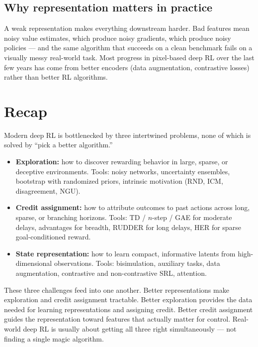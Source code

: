 \documentclass[11pt, oneside]{book}
\begin{document}
\subsection{Why representation matters in practice}

A weak representation makes everything downstream harder.
Bad features mean noisy value estimates, which produce noisy gradients, which produce
noisy policies --- and the same algorithm that succeeds on a clean benchmark fails
on a visually messy real-world task.
Most progress in pixel-based deep RL over the last few years has come from better
encoders (data augmentation, contrastive losses) rather than better RL algorithms.

\section{Recap}

Modern deep RL is bottlenecked by three intertwined problems, none of which is solved
by ``pick a better algorithm.''

\begin{itemize}
  \item \textbf{Exploration:} how to discover rewarding behavior in large, sparse, or
    deceptive environments.
    Tools: noisy networks, uncertainty ensembles, bootstrap with randomized priors,
    intrinsic motivation (RND, ICM, disagreement, NGU).
  \item \textbf{Credit assignment:} how to attribute outcomes to past actions across long,
    sparse, or branching horizons.
    Tools: TD / $n$-step / GAE for moderate delays, advantages for breadth, RUDDER for
    long delays, HER for sparse goal-conditioned reward.
  \item \textbf{State representation:} how to learn compact, informative latents from
    high-dimensional observations.
    Tools: bisimulation, auxiliary tasks, data augmentation, contrastive and non-contrastive
    SRL, attention.
\end{itemize}

These three challenges feed into one another. Better representations make exploration
and credit assignment tractable. Better exploration provides the data needed for
learning representations and assigning credit. Better credit assignment guides the
representation toward features that actually matter for control. Real-world deep RL
is usually about getting all three right simultaneously --- not finding a single magic
algorithm.
\end{document}
